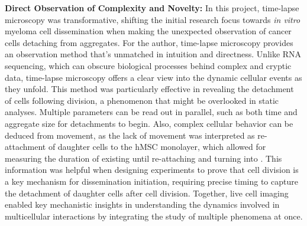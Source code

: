 
\textbf{Direct Observation of Complexity and Novelty:} In this project, time-lapse microscopy was
transformative, shifting the initial research focus towards \textit{in vitro}
myeloma cell dissemination when making the unexpected  observation of cancer cells detaching from aggregates.
For the author, time-lapse microscopy provides an observation method that's
unmatched in intuition and directness. Unlike RNA sequencing, which can obscure
biological processes behind complex and cryptic data, time-lapse microscopy
offers a clear view into the dynamic cellular events as they unfold. This method
was particularly effective in revealing the detachment of cells following
division, a phenomenon that might be overlooked in static analyses. Multiple
parameters can be read out in parallel, such as both time and aggregate size for
detachments to begin. Also, complex cellular behavior can be deduced from
movement, as the lack of movement was interpreted as re-attachment of \INA
daughter cells to the \ac{hMSC} monolayer, which allowed for measuring the
duration of \nMAina existing until re-attaching and turning into \MAina. This
information was helpful when designing experiments to prove that cell division
is a key mechanism for dissemination initiation, requiring precise timing to
capture the detachment of daughter cells after cell division. Together, live
cell imaging enabled key mechanistic insights in understanding the dynamics
involved in multicellular interactions by integrating the study of multiple
phenomena at once.

